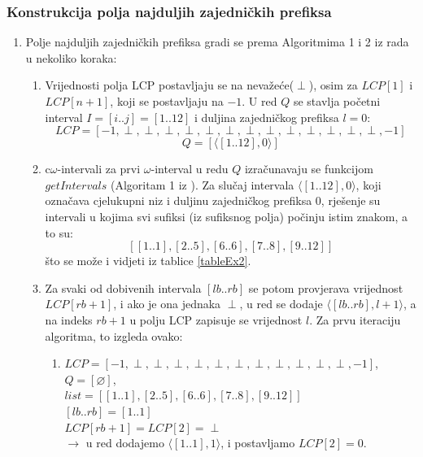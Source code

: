 \documentclass[a4paper,12pt]{article}
\begin{document}
\subsubsection{Konstrukcija polja najduljih zajedničkih prefiksa}

\begin{enumerate}
	\item Polje najduljih zajedničkih prefiksa gradi se prema Algoritmima 1 i 2 iz rada \cite{beller2013} u nekoliko koraka:

	\begin{enumerate}
		\item Vrijednosti polja LCP postavljaju se na nevažeće($\perp$), osim za $LCP[1]$ i $LCP[n+1]$, koji se postavljaju na $-1$. U red $Q$ se stavlja početni interval $I = [i..j] = [1..12]$ i duljina zajedničkog prefiksa $l = 0$:\\
	 	$$LCP = [-1,\perp,\perp,\perp,\perp,\perp,\perp,\perp,\perp,\perp,\perp,\perp,\perp, \perp, -1]$$
		$$Q = [\langle[1..12],0\rangle]$$

		\item c$\omega$-intervali za prvi $\omega$-interval u redu $Q$ izračunavaju se funkcijom $getIntervals$ (Algoritam 1 iz \cite{beller2013}). Za slučaj intervala $\langle[1..12],0\rangle$, koji označava cjelukupni niz i duljinu zajedničkog prefiksa $0$, rješenje su intervali u kojima svi sufiksi (iz sufiksnog polja) počinju istim znakom, a to su:
		$$ [[1..1],[2..5],[6..6],[7..8],[9..12]] $$
što se može i vidjeti iz tablice \ref{tableEx2}.

		\item Za svaki od dobivenih intervala $[lb..rb]$ se potom provjerava vrijednost $LCP[rb+1]$, i ako je ona jednaka $\perp$, u red se  dodaje $\langle[lb..rb],l+1\rangle$, a na indeks $rb+1$ u polju LCP zapisuje se vrijednost $l$. Za prvu iteraciju algoritma, to izgleda ovako:
			\begin{enumerate}
				\item $LCP = [-1,\perp,\perp,\perp,\perp,\perp,\perp,\perp,\perp,\perp,\perp, \perp, -1]$,\\
				$ Q = [\varnothing]$,\\
				$list = [[1..1],[2..5],[6..6],[7..8],[9..12]]$\\
				
				$ [lb..rb] = [1..1]$\\
						
				$LCP[rb+1]=LCP[2]=\perp$\\
				$\rightarrow$ u red dodajemo $\langle[1..1],1\rangle$, i postavljamo $LCP[2]=0$.
				\newline
						

\end{enumerate}
\end{enumerate}
\end{enumerate}
\end{document}
